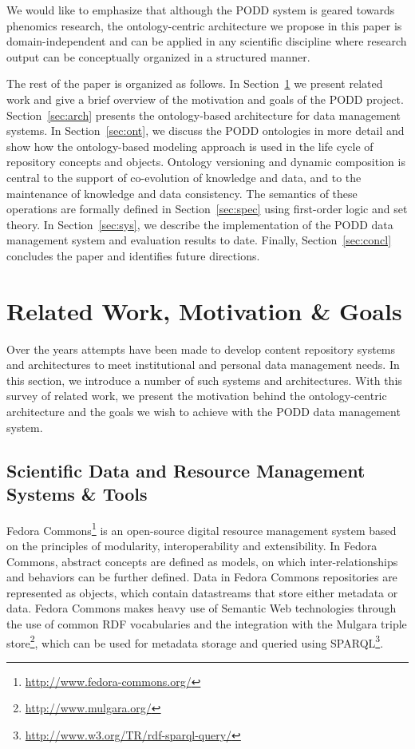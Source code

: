 \documentclass[preprint,12pt]{elsarticle}
\begin{document}
We would like to emphasize that although the PODD system is geared towards phenomics research, the ontology-centric architecture we propose in this paper is domain-independent and can be applied in any scientific discipline where research output can be conceptually organized in a structured manner. 

The rest of the paper is organized as follows. In Section~\ref{sec:overview} we present related work and give a brief overview of the motivation and goals of the PODD project. Section~\ref{sec:arch} presents the ontology-based architecture for data management systems. In Section~\ref{sec:ont}, we discuss the PODD ontologies in more detail and show how the ontology-based modeling approach is used in the life cycle of repository concepts and objects. 
Ontology versioning and dynamic composition is central to the support of co-evolution of knowledge and data, and to the maintenance of knowledge and data consistency. The semantics of these operations are formally defined in Section~\ref{sec:spec} using first-order logic and set theory. In Section~\ref{sec:sys}, we describe the implementation of the PODD data management system and evaluation results to date. Finally, Section~\ref{sec:concl} concludes the paper and identifies future directions.

\section{Related Work, Motivation \& Goals}\label{sec:overview}
Over the years attempts have been made to develop content repository systems and architectures to meet institutional and personal data management needs. In this section, we introduce a number of such systems and architectures. With this survey of related work, we present the motivation behind the ontology-centric architecture and the goals we wish to achieve with the PODD data management system.

\subsection{Scientific Data and Resource Management Systems \& Tools}
Fedora Commons\footnote{\url{http://www.fedora-commons.org/}} is an open-source digital resource management system based on the principles of modularity, interoperability and extensibility. In Fedora Commons, abstract concepts are defined as models, on which inter-relationships and behaviors can be further defined. Data in Fedora Commons repositories are represented as objects, which contain datastreams that store either metadata or data. Fedora Commons makes heavy use of Semantic Web technologies through the use of common RDF vocabularies and the integration with the Mulgara triple store\footnote{\url{http://www.mulgara.org/}}, which can be used for metadata storage and queried using SPARQL\footnote{\url{http://www.w3.org/TR/rdf-sparql-query/}}. 
\end{document}
